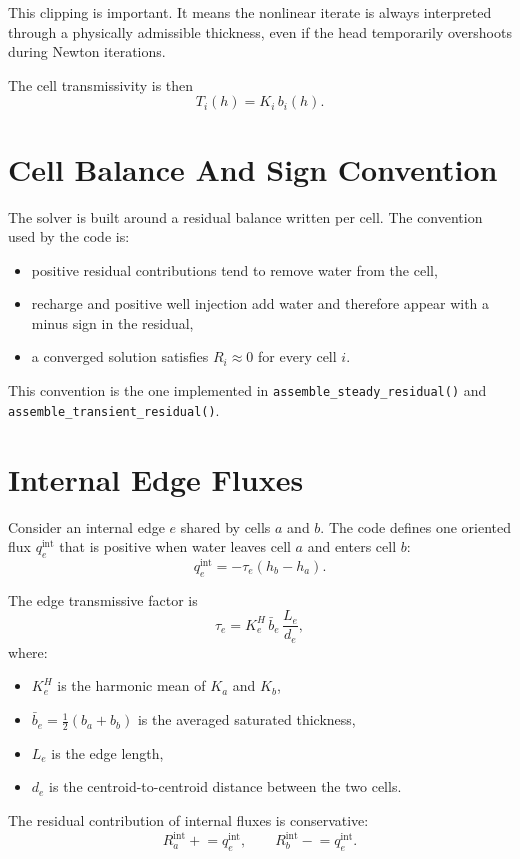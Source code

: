 \documentclass[11pt,a4paper]{article}
\begin{document}
This clipping is important. It means the nonlinear iterate is always interpreted
through a physically admissible thickness, even if the head temporarily
overshoots during Newton iterations.

The cell transmissivity is then
\[
T_i(h) = K_i\,b_i(h).
\]

\section{Cell Balance And Sign Convention}

The solver is built around a residual balance written per cell. The convention
used by the code is:

\begin{itemize}
\item positive residual contributions tend to remove water from the cell,
\item recharge and positive well injection add water and therefore appear with a
      minus sign in the residual,
\item a converged solution satisfies $R_i \approx 0$ for every cell $i$.
\end{itemize}

This convention is the one implemented in
\texttt{assemble\_steady\_residual()} and
\texttt{assemble\_transient\_residual()}.

\section{Internal Edge Fluxes}

Consider an internal edge $e$ shared by cells $a$ and $b$. The code defines one
oriented flux $q^{\text{int}}_e$ that is positive when water leaves cell $a$ and
enters cell $b$:
\[
q^{\text{int}}_e = -\tau_e(h_b - h_a).
\]

The edge transmissive factor is
\[
\tau_e
=
K^{H}_e\,\bar{b}_e\,\frac{L_e}{d_e},
\]
where:

\begin{itemize}
\item $K^{H}_e$ is the harmonic mean of $K_a$ and $K_b$,
\item $\bar{b}_e = \frac{1}{2}(b_a + b_b)$ is the averaged saturated thickness,
\item $L_e$ is the edge length,
\item $d_e$ is the centroid-to-centroid distance between the two cells.
\end{itemize}

The residual contribution of internal fluxes is conservative:
\[
R^{\text{int}}_a \mathrel{+}= q^{\text{int}}_e,
\qquad
R^{\text{int}}_b \mathrel{-}= q^{\text{int}}_e.
\]
\end{document}

